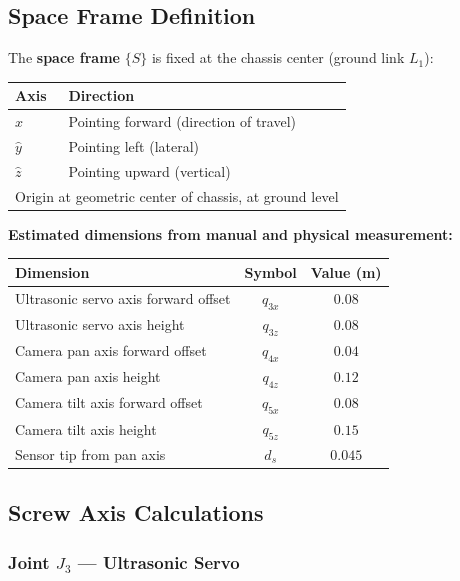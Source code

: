 \documentclass[12pt,a4paper]{article}
\begin{document}
\subsection{Space Frame Definition}

The \textbf{space frame} $\{S\}$ is fixed at the chassis center (ground link $L_1$):

\begin{center}
\renewcommand{\arraystretch}{1.2}
\begin{tabular}{ll}
\toprule
\textbf{Axis} & \textbf{Direction} \\
\midrule
$\hat{x}$ & Pointing forward (direction of travel) \\
$\hat{y}$ & Pointing left (lateral) \\
$\hat{z}$ & Pointing upward (vertical) \\
\midrule
\multicolumn{2}{l}{Origin at geometric center of chassis, at ground level} \\
\bottomrule
\end{tabular}
\end{center}

\vspace{6pt}
\textbf{Estimated dimensions from manual and physical measurement:}

\begin{center}
\begin{tabular}{lcc}
\toprule
\textbf{Dimension} & \textbf{Symbol} & \textbf{Value (m)} \\
\midrule
Ultrasonic servo axis forward offset & $q_{3x}$ & $0.08$ \\
Ultrasonic servo axis height & $q_{3z}$ & $0.08$ \\
Camera pan axis forward offset & $q_{4x}$ & $0.04$ \\
Camera pan axis height & $q_{4z}$ & $0.12$ \\
Camera tilt axis forward offset & $q_{5x}$ & $0.08$ \\
Camera tilt axis height & $q_{5z}$ & $0.15$ \\
Sensor tip from pan axis & $d_s$ & $0.045$ \\
\bottomrule
\end{tabular}
\end{center}

\subsection{Screw Axis Calculations}

\subsubsection{Joint $J_3$ --- Ultrasonic Servo}
\end{document}
